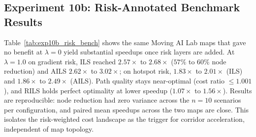 \documentclass[11pt]{article}
\begin{document}
\subsection{Experiment 10b: Risk-Annotated Benchmark Results}

\begin{table}[!htbp]
\centering
\caption{ILS, AILS, and RILS on Moving AI Lab random maps with synthetic risk layers. Speed = speedup vs.\ A*; Red = node reduction \%; Opt = path cost ratio.}
\label{tab:exp10b_risk_bench}
\end{table}

Table~\ref{tab:exp10b_risk_bench} shows the same Moving AI Lab maps that gave no benefit at $\lambda = 0$ yield substantial speedups once risk layers are added. At $\lambda = 1.0$ on gradient risk, ILS reached $2.57\times$ to $2.68\times$ ($57\%$ to $60\%$ node reduction) and AILS $2.62\times$ to $3.02\times$; on hotspot risk, $1.83\times$ to $2.01\times$ (ILS) and $1.86\times$ to $2.49\times$ (AILS). Path quality stays near-optimal (cost ratio $\leq 1.001$), and RILS holds perfect optimality at lower speedup ($1.07\times$ to $1.56\times$). Results are reproducible: node reduction had zero variance across the $n = 10$ scenarios per configuration, and paired mean speedups across the two maps are close. This isolates the risk-weighted cost landscape as the trigger for corridor acceleration, independent of map topology.
\end{document}
